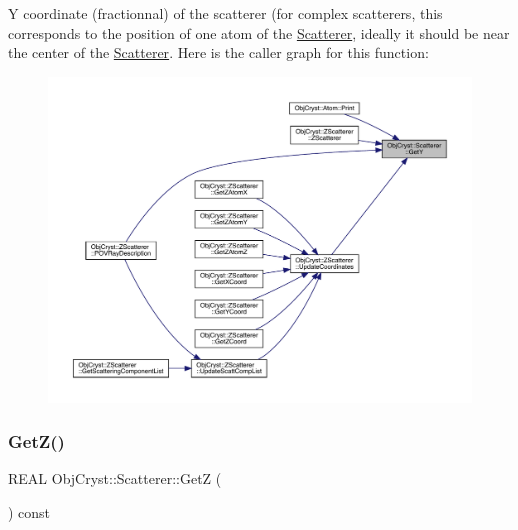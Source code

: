 Y coordinate (fractionnal) of the scatterer (for complex scatterers, this corresponds to the position of one atom of the \mbox{\hyperlink{class_obj_cryst_1_1_scatterer}{Scatterer}}, ideally it should be near the center of the \mbox{\hyperlink{class_obj_cryst_1_1_scatterer}{Scatterer}}. Here is the caller graph for this function\+:
\nopagebreak
\begin{figure}[H]
\begin{center}
\leavevmode
\includegraphics[width=350pt]{class_obj_cryst_1_1_scatterer_aeebaad938c35a825e78cf49a5fba5d3c_icgraph}
\end{center}
\end{figure}
\mbox{\label{class_obj_cryst_1_1_scatterer_ac1d8f78fc091087c13664b6186923616}} 
\subsubsection{\texorpdfstring{GetZ()}{GetZ()}}
{\footnotesize\ttfamily R\+E\+AL Obj\+Cryst\+::\+Scatterer\+::\+GetZ (\begin{DoxyParamCaption}{ }\end{DoxyParamCaption}) const}

